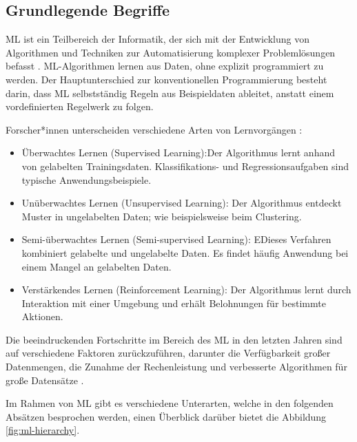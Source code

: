 \subsection{Grundlegende Begriffe}
\label{subsec:neuronale-netze}

\gls{ML} ist ein Teilbereich der Informatik, der sich mit der Entwicklung von Algorithmen und Techniken zur Automatisierung komplexer Problemlösungen befasst \parencite{RebalaGopinath2019AItM}. \gls{ML}-Algorithmen lernen aus Daten, ohne explizit programmiert zu werden. Der Hauptunterschied zur konventionellen Programmierung besteht darin, dass \gls{ML} selbstständig Regeln aus Beispieldaten ableitet, anstatt einem vordefinierten Regelwerk zu folgen.

Forscher*innen unterscheiden verschiedene Arten von Lernvorgängen \parencite{RebalaGopinath2019AItM, jordan2015machine}:

\begin{itemize}
	\item Überwachtes Lernen (Supervised Learning):Der Algorithmus lernt anhand von gelabelten Trainingsdaten. Klassifikations- und Regressionsaufgaben sind typische Anwendungsbeispiele.
	\item Unüberwachtes Lernen (Unsupervised Learning): Der Algorithmus entdeckt Muster in ungelabelten Daten; wie beispielsweise beim Clustering.
	\item Semi-überwachtes Lernen (Semi-supervised Learning): EDieses Verfahren kombiniert gelabelte und ungelabelte Daten. Es findet häufig Anwendung bei einem Mangel an gelabelten Daten.
	\item Verstärkendes Lernen (Reinforcement Learning): Der Algorithmus lernt durch Interaktion mit einer Umgebung und erhält Belohnungen für bestimmte Aktionen.
\end{itemize}

Die beeindruckenden Fortschritte im Bereich des \gls{ML} in den letzten Jahren sind auf verschiedene Faktoren zurückzuführen, darunter die Verfügbarkeit großer Datenmengen, die Zunahme der Rechenleistung und verbesserte Algorithmen für große Datensätze \parencite{jordan2015machine}.

Im Rahmen von \gls{ML} gibt es verschiedene Unterarten, welche in den folgenden Absätzen besprochen werden, einen Überblick darüber bietet die Abbildung \ref{fig:ml-hierarchy}.

